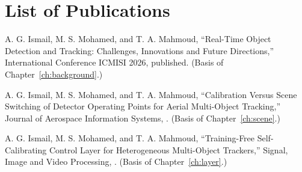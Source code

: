 \chapter*{List of Publications}
\thispagestyle{plain}
\label{sec:publications}
\begin{enumerate}[label={[P\arabic*]},leftmargin=1.2cm]
\item A. G. Ismail, M. S. Mohamed, and T. A. Mahmoud, ``Real-Time Object Detection and Tracking: Challenges, Innovations and Future Directions,'' International Conference ICMISI 2026, published. (Basis of Chapter~\ref{ch:background}.)
\item A. G. Ismail, M. S. Mohamed, and T. A. Mahmoud, ``Calibration Versus Scene Switching of Detector Operating Points for Aerial Multi-Object Tracking,'' Journal of Aerospace Information Systems, \PaperOneStatus. (Basis of Chapter~\ref{ch:scene}.)
\item A. G. Ismail, M. S. Mohamed, and T. A. Mahmoud, ``Training-Free Self-Calibrating Control Layer for Heterogeneous Multi-Object Trackers,'' Signal, Image and Video Processing, \PaperTwoStatus. (Basis of Chapter~\ref{ch:layer}.)
\end{enumerate}
